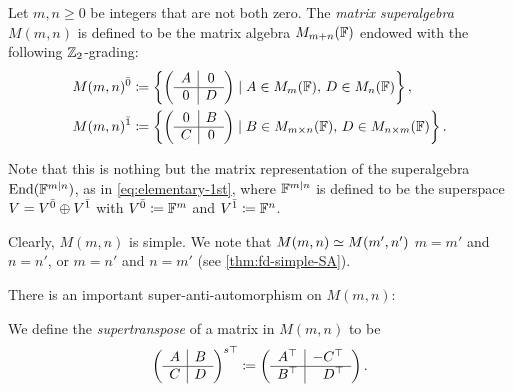 Let $m, n \geq 0$ be integers that are not both zero.
The \emph{matrix superalgebra} $M(m,n)$ is defined to be the matrix algebra $M_{m+n}(\mathbb{F})$ endowed with the following $\mathbb{Z}_2$-grading:
%
\begin{align}
    M(m,n)^{\bar0} &\coloneqq \left\{ \left(\begin{array}{c|c}
        A & 0\\
        \hline
        0 & D
    \end{array}\right)
    \mid A\in M_{m}(\mathbb{F}),\, D\in M_n(\mathbb{F}) \right\},\\
    M(m,n)^{\bar1} &\coloneqq \left\{
    \left(\begin{array}{c|c}
        0 & B\\
        \hline
        C & 0
    \end{array}\right)
    \mid B \in M_{m\times n}(\mathbb{F}), \, D\in M_{n\times m}(\mathbb{F}) \right\}.
\end{align}
%
\label{def:grd-superspace-canonical}

Note that this is nothing but the matrix representation of the superalgebra $\operatorname{End}(\mathbb{F}^{m|n})$, as in \cref{eq:elementary-1st}, where $\mathbb{F}^{m|n}$ is defined to be the superspace $V = V^{\bar0} \oplus V^{\bar1}$ with $V^{\bar0} \coloneqq \mathbb{F}^m$ and $V^{\bar1} \coloneqq \mathbb{F}^n$. 

% 
Clearly, $M(m,n)$ is simple. 
We note that $M(m,n) \simeq M(m',n')$ \IFF $m=m'$ and $n=n'$, or $m=n'$ and $n=m'$ (see \cref{thm:fd-simple-SA}). 

There is an important super-anti-automorphism on $M(m,n)$:

\begin{defi}
    We define the \emph{supertranspose} of a matrix in $M(m,n)$ to be
    \[
        \left(\begin{array}{c|c}
            A & B\\
            \hline
            C & D
        \end{array}\right)^{s\top} \coloneqq
        \left(\begin{array}{c|c}
            A^{\top} & -C^{\top}\\
            \hline
            B^{\top} & \phantom{-}D^{\top}
        \end{array}\right).
    \]
\end{defi}

